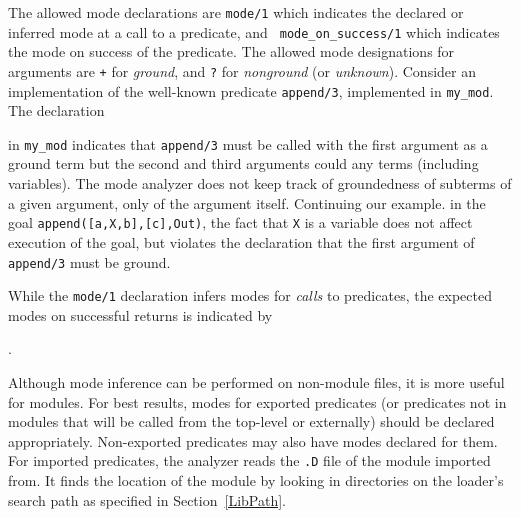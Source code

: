 \begin{description}

  The allowed mode declarations are {\tt mode/1} which indicates the
  declared or inferred mode at a call to a predicate, and {\tt
    mode\_on\_success/1} which indicates the mode on success of the
  predicate.  The allowed mode designations for arguments are {\tt +}
  for {\em ground}, and {\tt ?}  for {\em nonground} (or {\em
    unknown}).  Consider an implementation of the well-known predicate
  {\tt append/3}, implemented in {\tt my\_mod}.  The declaration


   in {\tt my\_mod} indicates that {\tt append/3} must be called with
   the first argument as a ground term but the second and third
   arguments could any terms (including variables).  The mode analyzer
   does not keep track of groundedness of subterms of a given
   argument, only of the argument itself.  Continuing our example. in
   the goal {\tt append([a,X,b],[c],Out)}, the fact that {\tt X} is a
   variable does not affect execution of the goal, but violates the
   declaration that the first argument of {\tt append/3} must be
   ground.

   While the {\tt mode/1} declaration infers modes for {\em calls} to
   predicates, the expected modes on successful returns is indicated
   by

.




     Although mode inference can be performed on non-module files, it
     is more useful for modules.  For best results, modes for exported
     predicates (or predicates not in modules that will be called from
     the top-level or externally) should be declared appropriately.
     Non-exported predicates may also have modes declared for them.
     For imported predicates, the analyzer reads the {\tt .D} file of
     the module imported from.  It finds the location of the module by
     looking in directories on the loader's search path as specified
     in Section~\ref{LibPath}.


\end{description}
